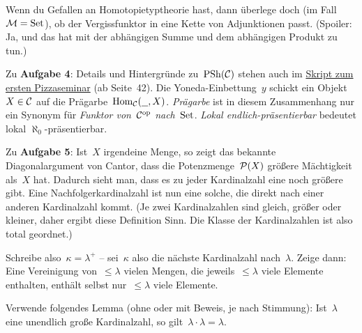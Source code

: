 \documentclass{uebblatt}
\begin{document}
Wenn du Gefallen an Homotopietyptheorie hast, dann überlege doch (im Fall~$\M =
\Set$), ob der Vergissfunktor in eine Kette von Adjunktionen passt.
(Spoiler: Ja, und das hat mit der abhängigen Summe und dem abhängigen Produkt
zu tun.)

Zu \textbf{Aufgabe 4}: Details und Hintergründe zu~$\PSh(\C)$ stehen auch im
\href{http://pizzaseminar.speicherleck.de/skript1/pizzaseminar.pdf}{Skript zum ersten
Pizzaseminar} (ab Seite~42). Die Yoneda-Einbettung~$y$ schickt ein Objekt~$X
\in \C$ auf die Prägarbe~$\Hom_\C(\smallplaceholder, X)$. \emph{Prägarbe} ist
in diesem Zusammenhang nur ein Synonym für \emph{Funktor von~$\C^\op$
nach~$\Set$}. \emph{Lokal endlich-präsentierbar} bedeutet lokal
$\aleph_0$-präsentierbar.

Zu \textbf{Aufgabe 5}: Ist~$X$ irgendeine Menge, so zeigt das bekannte
Diagonalargument von Cantor, dass die Potenzmenge~$\P(X)$ größere Mächtigkeit
als~$X$ hat. Dadurch sieht man, dass es zu jeder Kardinalzahl eine noch größere
gibt. Eine Nachfolgerkardinalzahl ist nun eine solche, die direkt nach einer
anderen Kardinalzahl kommt. (Je zwei Kardinalzahlen sind gleich, größer oder
kleiner, daher ergibt diese Definition Sinn. Die Klasse der Kardinalzahlen ist
also total geordnet.)

Schreibe also~$\kappa = \lambda^+$ -- sei~$\kappa$ also die nächste
Kardinalzahl nach~$\lambda$. Zeige dann: Eine Vereinigung von~$\leq
\lambda$ vielen Mengen, die jeweils~$\leq \lambda$ viele Elemente enthalten,
enthält selbst nur~$\leq \lambda$ viele Elemente.

Verwende folgendes Lemma (ohne oder mit Beweis, je nach Stimmung): Ist~$\lambda$ eine unendlich große
Kardinalzahl, so gilt~$\lambda \cdot \lambda = \lambda$.
\end{document}
